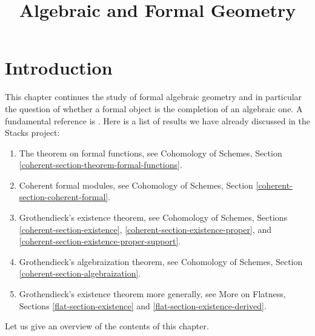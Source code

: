 

%


\title{Algebraic and Formal Geometry}


\maketitle

\label{section-phantom}

\tableofcontents

\section{Introduction}
\label{section-introduction}

\noindent
This chapter continues the study of formal algebraic geometry
and in particular the question of whether a formal object is
the completion of an algebraic one. A fundamental reference is \cite{SGA2}.
Here is a list of results we have already discussed
in the Stacks project:
\begin{enumerate}
\item The theorem on formal functions, see
Cohomology of Schemes, Section \ref{coherent-section-theorem-formal-functions}.
\item Coherent formal modules, see
Cohomology of Schemes, Section \ref{coherent-section-coherent-formal}.
\item Grothendieck's existence theorem, see
Cohomology of Schemes, Sections \ref{coherent-section-existence},
\ref{coherent-section-existence-proper}, and
\ref{coherent-section-existence-proper-support}.
\item Grothendieck's algebraization theorem, see
Cohomology of Schemes, Section \ref{coherent-section-algebraization}.
\item Grothendieck's existence theorem more generally, see
More on Flatness, Sections \ref{flat-section-existence} and
\ref{flat-section-existence-derived}.
\end{enumerate}
Let us give an overview of the contents of this chapter.

